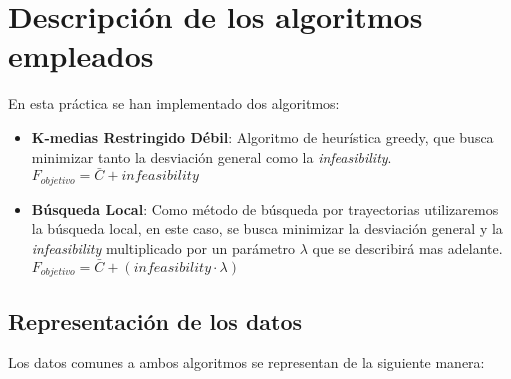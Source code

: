 \chapter{Descripción de los algoritmos empleados}

En esta práctica se han implementado dos algoritmos:
\begin{itemize}
   \item \textbf{K-medias Restringido Débil}: Algoritmo de heurística greedy, que busca minimizar tanto la desviación general como la \emph{infeasibility}. $ F_{objetivo} = \bar{C} + infeasibility $
   \item \textbf{Búsqueda Local}: Como método de búsqueda por trayectorias utilizaremos la búsqueda local, en este caso, se busca minimizar la desviación general y la \emph{infeasibility} multiplicado por un parámetro $ \lambda $ que se describirá mas adelante. $ F_{objetivo} = \bar{C} + (infeasibility \cdot \lambda) $
\end{itemize}

\section{Representación de los datos}
Los datos comunes a ambos algoritmos se representan de la siguiente manera:

